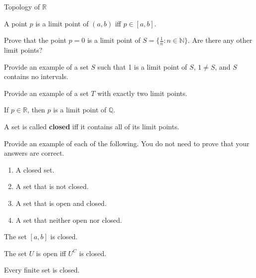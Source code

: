 \begin{section}{Topology of $\mathbb{R}$}
\begin{theorem}
A point $p$ is a limit point of $(a,b)$ iff $p\in [a,b]$.
\end{theorem}

\begin{problem}
Prove that the point $p=0$ is a limit point of $S=\{\frac{1}{n}: n \in \mathbb{N}\}$.  Are there any other limit points?
\end{problem}

\begin{exercise}
Provide an example of a set $S$ such that 1 is a limit point of $S$, $1\neq S$, and $S$ contains no intervals.
\end{exercise}

\begin{exercise}
Provide an example of a set $T$ with exactly two limit points.
\end{exercise}

\begin{theorem}
If $p\in\mathbb{R}$, then $p$ is a limit point of $\mathbb{Q}$.
\end{theorem}

\begin{definition}
A set is called \textbf{closed} iff it contains all of its limit points.
\end{definition}

\begin{exercise}
Provide an example of each of the following.  You do not need to prove that your answers are correct.
\begin{enumerate}[label=\textrm{(\alph*)}]
\item A closed set.
\item A set that is not closed.
\item A set that is open and closed.
\item A set that neither open nor closed.
\end{enumerate}

\end{exercise}

\begin{theorem}
The set $[a,b]$ is closed.
\end{theorem}

\begin{theorem}
The set $U$ is open iff $U^C$ is closed.
\end{theorem}

\begin{theorem}
Every finite set is closed.
\end{theorem}


\end{section}

